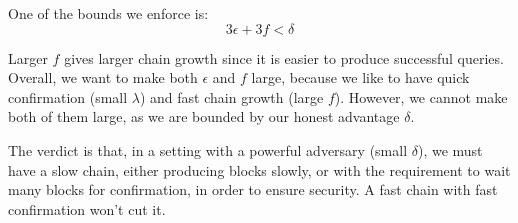 One of the bounds we enforce is:
$$3\epsilon + 3f < \delta$$

Larger $f$ gives larger chain growth since it is easier to produce successful queries. Overall, we want to make both $\epsilon$ and $f$ large, because we like to have quick confirmation (small $\lambda$) and fast chain growth (large $f$). However, we cannot make both of them large, as we are bounded by our honest advantage $\delta$.

The verdict is that, in a setting with a powerful adversary (small $\delta$), we must have a slow chain, either producing blocks slowly, or with the requirement to wait many blocks for confirmation, in order to ensure security. A fast chain with fast confirmation won't cut it.
